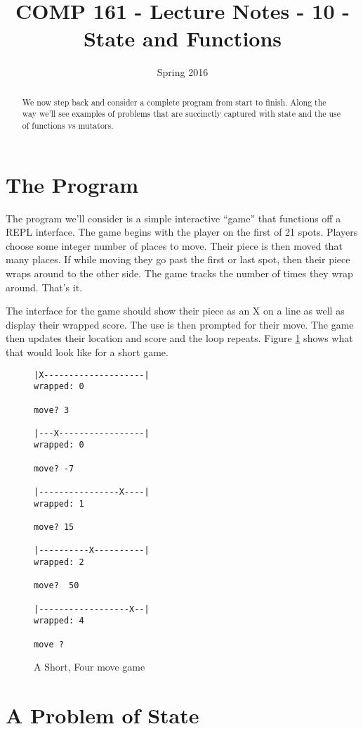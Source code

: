 \documentclass[nobib]{tufte-handout}
\title{COMP 161 - Lecture Notes - 10 - State and Functions}
\date{Spring 2016}
\begin{document}
 
\maketitle

\begin{abstract}
We now step back and consider a complete program from start to finish. Along the way we'll see examples of problems that are succinctly captured with state and the use of functions vs mutators. 
\end{abstract}

\section{The Program}

The program we'll consider is a simple interactive ``game'' that functions off a REPL interface. The game begins with the player on the first of 21 spots. Players choose some integer number of places to move. Their piece is then moved that many places. If while moving they go past the first or last spot, then their piece wraps around to the other side. The game tracks the number of times they wrap around. That's it. 

The interface for the game should show their piece as an X on a line as well as display their wrapped score. The use is then prompted for their move. The game then updates their location and score and the loop repeats. Figure \ref{fig:example} shows what that would look like for a short game. 

\begin{figure}[!htbp]
\begin{verbatim}
|X--------------------|
wrapped: 0 

move? 3

|---X-----------------|
wrapped: 0 

move? -7

|----------------X----|
wrapped: 1 

move? 15

|----------X----------|
wrapped: 2 

move?  50

|------------------X--|
wrapped: 4 

move ?
\end{verbatim}
\label{fig:example}
\caption{A Short, Four move game}
\end{figure}

\section{A Problem of State}
\end{document}
